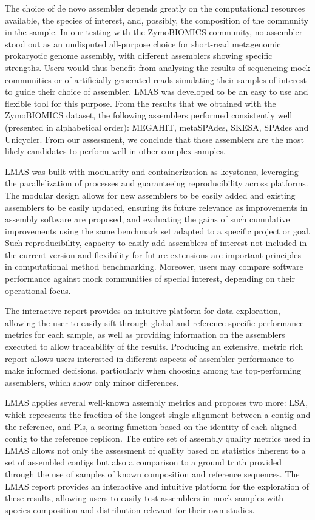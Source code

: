 The choice of de novo assembler depends greatly on the computational resources available, the species of interest, and, possibly, the composition of the community in the sample. In our testing with the ZymoBIOMICS community, no assembler stood out as an undisputed all-purpose choice for short-read metagenomic prokaryotic genome assembly, with different assemblers showing specific strengths. Users would thus benefit from analysing the results of sequencing mock communities or of artificially generated reads simulating their samples of interest to guide their choice of assembler. LMAS was developed to be an easy to use and flexible tool for this purpose. From the results that we obtained with the ZymoBIOMICS dataset, the following assemblers performed consistently well (presented in alphabetical order): MEGAHIT, metaSPAdes, SKESA, SPAdes and Unicycler. From our assessment, we conclude that these assemblers are the most likely candidates to perform well in other complex samples.

LMAS was built with modularity and containerization as keystones, leveraging the parallelization of processes and guaranteeing reproducibility across platforms. The modular design allows for new assemblers to be easily added and existing assemblers to be easily updated, ensuring its future relevance as improvements in assembly software are proposed, and evaluating the gains of such cumulative improvements using the same benchmark set adapted to a specific project or goal. Such reproducibility, capacity to easily add assemblers of interest not included in the current version and flexibility for future extensions are important principles in computational method benchmarking. Moreover, users may compare software performance against mock communities of special interest, depending on their operational focus.

The interactive report provides an intuitive platform for data exploration, allowing the user to easily sift through global and reference specific performance metrics for each sample, as well as providing information on the assemblers executed to allow traceability of the results. Producing an extensive, metric rich report allows users interested in different aspects of assembler performance to make informed decisions, particularly when choosing among the top-performing assemblers, which show only minor differences.

LMAS applies several well-known assembly metrics and proposes two more: \ac{LSA}, which represents the fraction of the longest single alignment between a contig and the reference, and \ac{Pls}, a scoring function based on the identity of each aligned contig to the reference replicon. The entire set of assembly quality metrics used in LMAS allows not only the assessment of quality based on statistics inherent to a set of assembled contigs but also a comparison to a ground truth provided through the use of samples of known composition and reference sequences. The LMAS report provides an interactive and intuitive platform for the exploration of these results, allowing users to easily test assemblers in mock samples with species composition and distribution relevant for their own studies.

